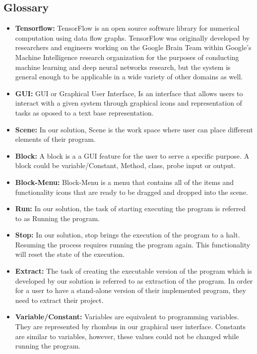 \documentclass[journal,10pt,onecolumn,compsoc]{IEEEtran} \usepackage[margin=1.0in]{geometry} \usepackage{pdfpages} \usepackage{graphicx}
\begin{document}
\subsection{Glossary}
\begin{itemize}
	\item \textbf{Tensorflow:}
		TensorFlow is an open source software library for numerical computation using data flow graphs.
		TensorFlow was originally developed by researchers and engineers working on the Google Brain Team within
		Google's Machine Intelligence research organization for the purposes of conducting machine learning and 
		deep neural networks research, but the system is general enough to be applicable in a wide variety of other domains as well.
	\item \textbf{GUI:}
		GUI or Graphical User Interface, Is an interface that allows users to interact with a given system through graphical icons and representation of tasks as oposed to a text base representation.
	\item \textbf{Scene:}
		In our solution, Scene is the work space where user can place different elements of their program.
	\item \textbf{Block:}
		A block is a a GUI feature for the user to serve a specific purpose. A block could be variable/Constant, Method, class, probe input or output.
	\item \textbf{Block-Menu:}
		Block-Menu is a menu that contains all of the items and functionality icons that are ready to be dragged and dropped into the scene.
	\item \textbf{Run:}
		In our solution, the task of starting executing the program is referred to as Running the program.
	\item \textbf{Stop:}
		In our solution, stop brings the execution of the program to a halt. Resuming the process requires running the program again.
		This functionality will reset the state of the execution.
	\item \textbf{Extract:}
		The task of creating the executable version of the program which is developed by our solution is referred to as extraction of the program.
		In order for a user to have a stand-alone version of their implemented program, they need to extract their project.
	\item \textbf{Variable/Constant:}
		Variables are equivalent to programming variables. They are represented by rhombus in our graphical user interface.
		Constants are similar to  variables, however, these values could not be changed while running the program.

\end{itemize}
\end{document}
